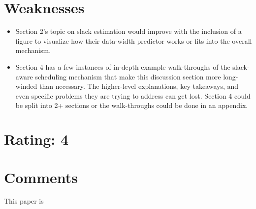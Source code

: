 \documentclass [12pt]{article}
\begin{document}
    \section{Weaknesses} %
    \label{sec:weaknesses}
        \begin{itemize}
            \item Section 2's topic on slack estimation would improve with the inclusion of a figure to visualize how their data-width predictor works or fits into the overall mechanism.
            \item Section 4 has a few instances of in-depth example walk-throughs of the slack-aware scheduling mechanism that make this discussion section more long-winded than necessary. The higher-level explanations, key takeaways, and even specific problems they are trying to address can get lost. Section 4 could be split into 2+ sections or the walk-throughs could be done in an appendix. 
        \end{itemize}

    \section{Rating: 4} %
    \label{sec:rating}

    \section{Comments} %
    \label{sec:comments}

    This paper is 


 
        


\end{document}
